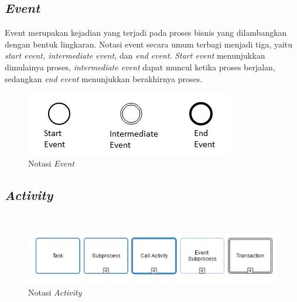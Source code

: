 \subsection{\textit{Event}}
\label{sec:event}
Event merupakan kejadian yang terjadi pada proses bisnis yang dilambangkan dengan bentuk lingkaran. Notasi event secara umum terbagi menjadi tiga, yaitu \textit{start event, intermediate event,} dan \textit{end event}. \textit{Start event} menunjukkan dimulainya proses, \textit{intermediate event} dapat muncul ketika proses berjalan, sedangkan \textit{end event} menunjukkan berakhirnya proses.  
\begin{figure}[H]
	\centering
	\includegraphics[scale=1]{Gambar/Bab-2/bpmn/event1}
	\caption{Notasi \textit{Event}} 
	\label{event}
\end{figure}

\subsection{\textit{Activity}}
\label{sec:activity}

\
\begin{figure}[H]
	\centering
	\includegraphics[scale=1]{Gambar/Bab-2/bpmn/activity}
	\caption{Notasi \textit{Activity}} 
	\label{activity}
\end{figure}

